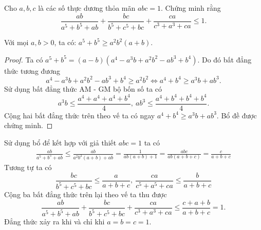 \begin{problem}
Cho $a, b, c$ là các số thực dương thỏa mãn $abc = 1$. Chứng minh rằng
\[
	\frac{ab}{a^5 + b^5 + ab} + \frac{bc}{b^5 + c^5 + bc} + \frac{ca}{c^3 + a^3 + ca} \le 1.
\]
\solution

\begin{mybox}
\begin{lemma}
Với mọi $a, b > 0$, ta có: $a^5 + b^5 \ge a^2 b^2(a + b)$.
\end{lemma}

\begin{proof}
Ta có $a^5 + b^5 = (a - b)(a^4 - a^3b + a^2b^2 - ab^3 + b^4)$.
Do đó bất đẳng thức tương đương
\[
	a^4 - a^3b + a^2b^2 - ab^3 + b^4 \ge a^2b^2 \Leftrightarrow a^4 + b^4 \ge a^3b + ab^3.
\]
Sử dụng bất đẳng thức AM - GM bộ bốn số ta có
\[
	a^3b \le \frac{a^4 + a^4 + a^4 + b^4}{4},\ ab^3 \le \frac{a^4 + b^4 + b^4 + b^4}{4}.
\]
Cộng hai bất đẳng thức trên theo vế ta có ngay $a^4 + b^4 \ge a^3b + ab^3$. Bổ đề được chứng minh.
\end{proof}
\end{mybox}

Sử dụng bổ để kết hợp với giả thiết $abc = 1$ ta có
\begin{align*}
\frac{ab}{a^5 + b^5 + ab} \le \frac{ab}{a^2b^2(a + b) + ab} = \frac{1}{ab(a + b) + 1} = \frac{abc}{ab(a + b + c)} = \frac{c}{a + b + c}
\end{align*}
Tương tự ta có 
\[
	\frac{bc}{b^5 + c^5 + bc} \le \frac{a}{a + b + c},\ \frac{ca}{c^5 + a^5 + ca} \le \frac{b}{a + b + c}
\]
Cộng ba bất đẳng thức trên lại theo vế ta thu được
\[
	\frac{ab}{a^5 + b^5 + ab} + \frac{bc}{b^5 + c^5 + bc} + \frac{ca}{c^3 + a^3 + ca} \le 
	\frac{c + a + b}{a + b + c} = 1.
\]
Đẳng thức xảy ra khi và chỉ khi $a = b = c = 1$.
\end{problem}